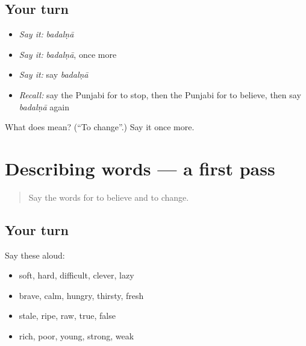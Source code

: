 \subsection*{Your turn}
\begin{itemize}
\raggedright
  \item \emph{Say it:} \emph{badalṇā}
  \item \emph{Say it:} \emph{badalṇā}, once more
  \item \emph{Say it:} say \emph{badalṇā}
  \item \emph{Recall:} say the Punjabi for to stop, then the Punjabi for to believe, then say \emph{badalṇā} again
\end{itemize}

\begin{tcolorbox}[breakable,colback=teal!4,colframe=teal!35!black,title={Before you move on}]
What does  mean? (\textquotedblleft{}To change\textquotedblright{}.) Say it once more.
\end{tcolorbox}
\section[(dialogue)]{Describing words — a first pass}

\label{lesson:PA-R152-first-pass-describing-words}



\begin{quote}
Say the words for to believe and to change.
\end{quote}

\subsection*{Your turn}
Say these aloud:

\begin{itemize}
\raggedright
  \item soft, hard, difficult, clever, lazy
  \item brave, calm, hungry, thirsty, fresh
  \item stale, ripe, raw, true, false
  \item rich, poor, young, strong, weak
\end{itemize}

